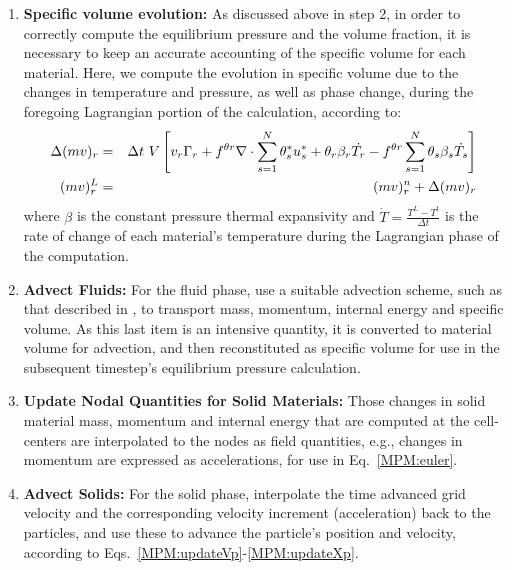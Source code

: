 \begin{enumerate}
\item {\bf Specific volume evolution:} As discussed above in step 2, in order to
correctly compute the equilibrium pressure and the volume fraction, it is necessary
to keep an accurate accounting of the specific volume for each material.  Here, 
we compute the evolution in specific volume due to the changes in temperature 
and pressure, as well as phase change, during the foregoing Lagrangian 
portion of the calculation, according to:
\begin{eqnarray}
  \Delta(mv)_r &=& \Delta t~ V 
     \left[ v_r \Gamma_r 
        + f^{\theta r} \nabla \cdot \sum\limits_{s=1}^N{\theta_s^*u_s^*}
               + \theta_r \beta_r \dot{T_r} 
        - f^{\theta r} \sum\limits_{s=1}^N{\theta_s \beta_s \dot{T_s}}\right]   
     \label{eq:eqspvoldiscrete} \\
  (mv)_r^L &=& (mv)_r^n + \Delta(mv)_r \label{eq:eqspvolLag}
\end{eqnarray}
where $\beta$ is the constant pressure thermal expansivity and
$\dot{T}=\frac{T^L - T^t}{\Delta{t}}$ is the rate of change of each material's
temperature during the Lagrangian phase of the computation.

\item {\bf Advect Fluids:} For the fluid phase, use a suitable advection scheme,
such as that described in \cite{Kashiwa1998}, to transport mass, momentum, internal energy 
and specific volume.  As this last item is an intensive quantity, it is converted
to material volume for advection, and then reconstituted as specific volume
for use in the subsequent timestep's equilibrium pressure calculation.

\item{\bf Update Nodal Quantities for Solid Materials:}  Those changes in 
solid material mass, momentum and internal energy that are computed at the 
cell-centers are interpolated to the nodes as field quantities, e.g., changes 
in momentum are expressed as accelerations, for use in Eq.~\ref{MPM:euler}.

\item {\bf Advect Solids:} For the solid phase, interpolate the time advanced
grid velocity and the corresponding velocity increment (acceleration) back 
to the particles, and use these to advance the particle's position and 
velocity, according to Eqs.~\ref{MPM:updateVp}-\ref{MPM:updateXp}.

\end{enumerate}

